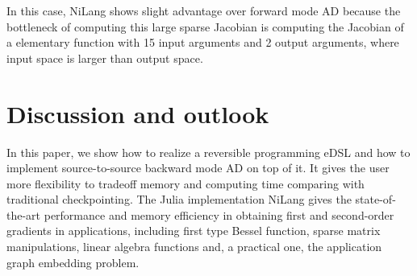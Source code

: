 \documentclass{article}
\newcommand{\<}{\langle}
\renewcommand{\>}{\rangle}
\newcommand{\ra}[1]{\renewcommand{\arraystretch}{#1}}
\theoremstyle{definition}\newtheorem{definition}{\textit{Definition}}
\begin{document}
\begin{table}[h!]\centering
    \scriptsize
\begin{minipage}{\columnwidth}
\ra{1.3}
    \caption{Absolute runtimes in seconds for computing the objective (O) and Jacobians (J) in bundle adjustment.}\label{tbl:ba}
\end{minipage}
\end{table}

In this case, NiLang shows slight advantage over forward mode AD because the bottleneck of computing this large sparse Jacobian is computing the Jacobian of a elementary function with 15 input arguments and 2 output arguments, where input space is larger than output space.

\section{Discussion and outlook}\label{sec:discussion}
In this paper, we show how to realize a reversible programming eDSL and how to implement source-to-source backward mode AD on top of it.
It gives the user more flexibility to tradeoff memory and computing time comparing with traditional checkpointing.
The Julia implementation NiLang gives the state-of-the-art performance and memory efficiency in obtaining first and second-order gradients in applications, including first type Bessel function, sparse matrix manipulations, linear algebra functions and, a practical one, the application graph embedding problem.
\end{document}
